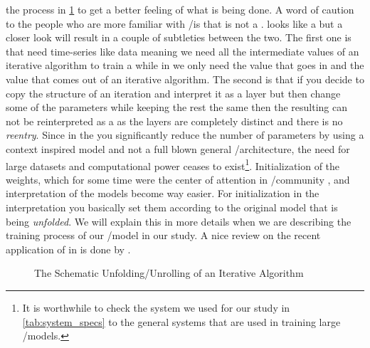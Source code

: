 the process in \cref{fig:deep_unfolding_unrolling} to get a better feeling of what is being done. A word of caution to the people who are more familiar with \ml/\dl is that \du is not a \rnn\cite{Gregor2010}. \DU looks like a \rnn\cite{Gregor2010} but 
a closer look will result in a couple of subtleties between the two. The first one is that \rnns need time-series like data meaning we need all 
the intermediate values of an iterative algorithm to train a \rnn while in \du we only need the value that goes in and the value that comes out of an iterative algorithm. The second is that if 
you decide to copy the structure of an iteration and interpret it as a layer but then change some of the parameters while keeping the rest the same then 
the resulting \nn can not be reinterpreted as a \rnn as the layers are completely distinct and there is no \emph{reentry}. Since in the \du
 you significantly reduce the number of parameters by using a context inspired model and not a full blown general \ml/\dl architecture, 
 the need for large datasets and computational power ceases to exist\footnote{It is worthwhile to check the system we used for our 
study in \cref{tab:system_specs} to the general systems\cite{Meuer} that are used in training large \ml/\dl models.}. Initialization 
of the weights, which for some time were the center of attention in \ml/\dl community \cite{Glorot2010}\cite{He2015a}, 
and interpretation of the models become way easier. For initialization in the \du interpretation you basically set them according 
to the original model that is being \emph{unfolded}. We will explain this in more details when we are describing the 
training process of our \ml/\dl model in our study. A nice review on the recent application of \du in \dsip is done by \cite{Monga2019}.

\begin{figure}
  \centering
	\captionsetup{justification=centering}
  \resizebox{35em}{10em}{}
  \caption{The Schematic Unfolding/Unrolling of an Iterative Algorithm}
  \label{fig:deep_unfolding_unrolling}
\end{figure}








